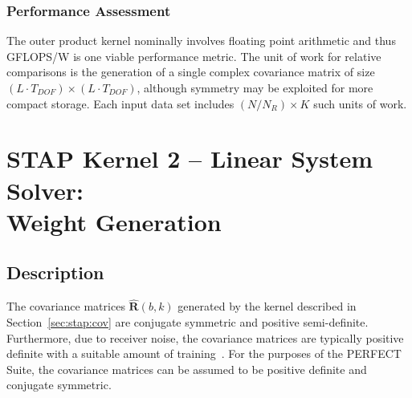 \documentclass{report}
\begin{document}
\subsubsection{Performance Assessment}

The outer product kernel nominally involves floating point arithmetic and thus
GFLOPS/W is one viable performance metric.
The unit of work for relative comparisons is the generation of a single complex
covariance matrix of size $(L \cdot T_{DOF}) \times (L \cdot T_{DOF})$, although
symmetry may be exploited for more compact storage.
Each input data set includes $(N/N_R) \times K$ such units of work.


\section{STAP Kernel 2 -- Linear System Solver:\\ Weight Generation}

\subsection{Description}

The covariance matrices $\hat{\mathbf{R}}(b,k)$ generated by the
kernel described in Section~\ref{sec:stap:cov} are conjugate symmetric
and positive semi-definite.
Furthermore, due to receiver noise, the covariance matrices are
typically positive definite with a suitable amount of
training~\cite[Chapter~10]{POMRv2}.
For the purposes of the PERFECT Suite, the covariance matrices
can be assumed to be positive definite and conjugate symmetric.
\end{document}

